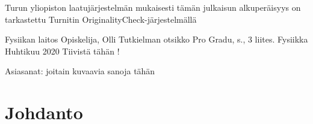 \vfill

\hspace*{-2cm}\parbox{\textwidth}{Turun yliopiston laatujärjestelmän mukaisesti
  tämän julkaisun alkuperäisyys on tarkastettu Turnitin
  OriginalityCheck-järjestelmällä} 


\newpage
\begin{tiivistelma}%
        {Fysiikan laitos}%
        {Opiskelija, Olli}%
        {Tutkielman otsikko}
        {Pro Gradu, \pageref{LastPage} s., 3 liites.}%
        {Fysiikka}%
        {Huhtikuu 2020}%
	Tiivistä tähän !
	
	Asiasanat: joitain kuvaavia sanoja tähän
\end{tiivistelma}


\tableofcontents %
\newpage
{} %
\section*{Johdanto}


